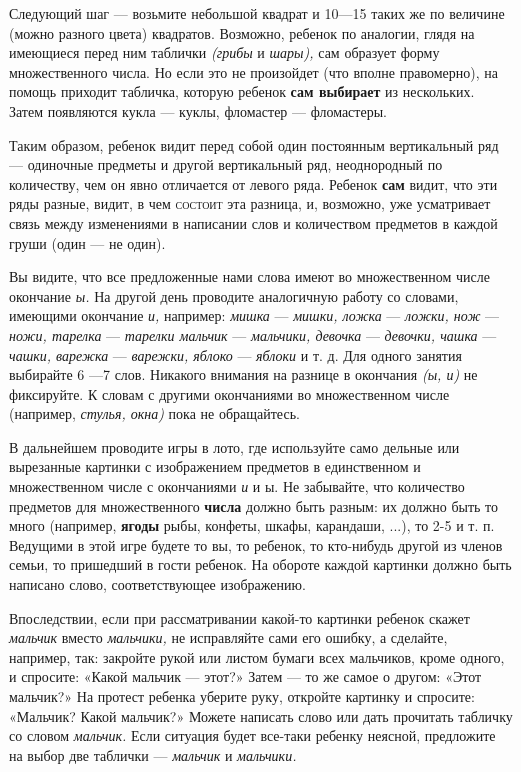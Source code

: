 \documentclass{book}
\renewcommand{\emph}[1]{\textit{#1}}
\begin{document}
Следующий шаг --- возьмите небольшой квадрат и 10---15 таких же по
величине (можно разного цвета) квадратов. Возможно, ребенок по аналогии,
глядя на имеющиеся перед ним таблички \emph{(грибы} и \emph{шары),} сам
образует форму множественного числа. Но если это не произойдет (что
вполне правомерно), на помощь приходит табличка, которую ребенок
\textbf{сам выбирает} из нескольких. Затем появляются кукла --- куклы,
фломастер --- фломастеры.

Таким образом, ребенок видит перед собой один постоянным вертикальный
ряд --- одиночные предметы и другой вертикальный ряд, неоднородный по
количеству, чем он явно отличается от левого ряда. Ребенок \textbf{сам}
видит, что эти ряды разные, видит, в чем \textsc{состоит} эта разница,
и, возможно, уже усматривает связь между изменениями в написании слов и
количеством предметов в каждой груши (один --- не один).

Вы видите, что все предложенные нами слова имеют во множественном числе
окончание \emph{ы.} На другой день проводите аналогичную работу со
словами, имеющими окончание \emph{и,} например: \emph{мишка} ---
\emph{мишки, ложка} --- \emph{ложки, нож} --- \emph{ножи, тарелка} ---
\emph{тарелки мальчик} --- \emph{мальчики, девочка} --- \emph{девочки,
чашка} --- \emph{чашки, варежка} --- \emph{варежки, яблоко} ---
\emph{яблоки} и т. д. Для одного занятия выбирайте 6 ---7 слов. Никакого
внимания на разнице в окончания \emph{(ы, и)} не фиксируйте. К словам с
другими окончаниями во множественном числе (например, \emph{стулья,
окна)} пока не обращайтесь.

В дальнейшем проводите игры в лото, где используйте само дельные или
вырезанные картинки с изображением предметов в единственном и
множественном числе с окончаниями \emph{и} и ы. Не забывайте, что
количество предметов для множественного \textbf{числа} должно быть
разным: их должно быть то много (например, \textbf{ягоды} рыбы, конфеты,
шкафы, карандаши, ...), то 2-5 и т. п. Ведущими в этой игре будете то
вы, то ребенок, то кто-нибудь другой из членов семьи, то пришедший в
гости ребенок. На обороте каждой картинки должно быть написано слово,
соответствующее изображению.

Впоследствии, если при рассматривании какой-то картинки ребенок скажет
\emph{мальчик} вместо \emph{мальчики,} не исправляйте сами его ошибку, а
сделайте, например, так: закройте рукой или листом бумаги всех
мальчиков, кроме одного, и спросите: «Какой мальчик --- этот?» Затем ---
то же самое о другом: «Этот мальчик?» На протест ребенка уберите руку,
откройте картинку и спросите: «Мальчик? Какой мальчик?» Можете написать
слово или дать прочитать табличку со словом \emph{мальчик.} Если
ситуация будет все-таки ребенку неясной, предложите на выбор две
таблички --- \emph{мальчик} и \emph{мальчики.}
\end{document}
